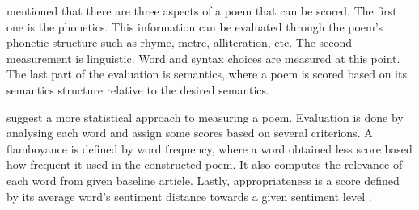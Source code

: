 \citeauthor{manurung2000towards} mentioned that there are three aspects of a poem that can be scored. The first one is the phonetics. This information can be evaluated through the poem's phonetic structure such as rhyme, metre, alliteration, etc. The second measurement is linguistic. Word and syntax choices are measured at this point. The last part of the evaluation is semantics, where a poem is scored based on its semantics structure relative to the desired semantics\cite{manurung2000towards}.


\citeauthor{colton2012full} suggest a more statistical approach to measuring a poem. Evaluation is done by analysing each word and assign some scores based on several criterions. A flamboyance is defined by word frequency, where a word obtained less score based how frequent it used in the constructed poem. It also computes the relevance of each word from given baseline article. Lastly, appropriateness is a score defined by its average word's sentiment distance towards a given sentiment level \cite{colton2012full}.